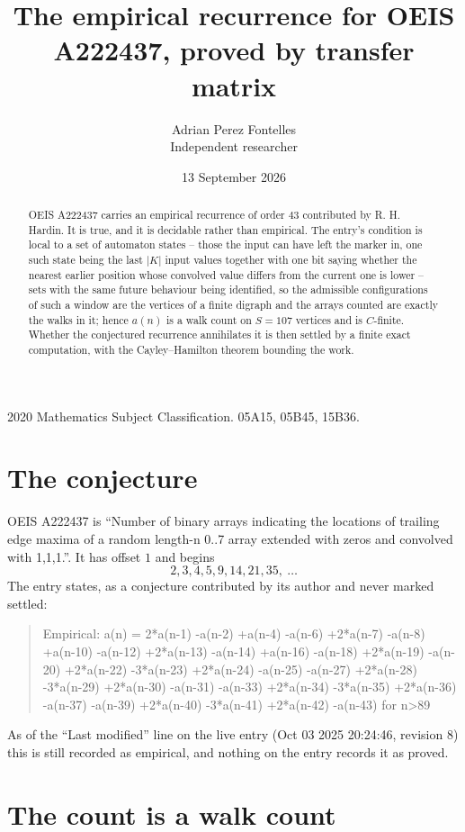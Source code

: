 \documentclass[11pt,a4paper]{article}
\title{The empirical recurrence for OEIS A222437, proved by transfer matrix}
\author{Adrian Perez Fontelles\\ \small Independent researcher}
\date{13 September 2026}
\theoremstyle{plain}
\theoremstyle{definition}
\begin{document}
\maketitle

\begin{abstract}
OEIS A222437 carries an empirical recurrence of order $43$ contributed by R. H. Hardin. It is
true, and it is decidable rather than empirical. The entry's condition is local to a set of automaton states -- those the input can have left the marker in, one such state being the last $|K|$ input values together with one bit saying whether the nearest earlier position whose convolved value differs from the current one is lower -- sets with the same future behaviour being identified, so
the admissible configurations of such a window are the vertices of a finite digraph and the
arrays counted are exactly the walks in it; hence $a(n)$ is a walk count on $S=107$ vertices
and is $C$-finite. Whether the conjectured recurrence annihilates it is then settled by a
finite exact computation, with the Cayley--Hamilton theorem bounding the work.
\end{abstract}

\noindent\small 2020 Mathematics Subject Classification. 05A15, 05B45, 15B36.\normalsize

\section{The conjecture}

OEIS A222437 is ``Number of binary arrays indicating the locations of trailing edge maxima of a random length-n 0..7 array extended with zeros and convolved with 1,1,1.''. It has offset $1$ and begins
\[
2, 3, 4, 5, 9, 14, 21, 35,\ \dots
\]
The entry states, as a conjecture contributed by its author and never marked settled:
\begin{quote}
Empirical: a(n) = 2*a(n-1) -a(n-2) +a(n-4) -a(n-6) +2*a(n-7) -a(n-8) +a(n-10) -a(n-12) +2*a(n-13) -a(n-14) +a(n-16) -a(n-18) +2*a(n-19) -a(n-20) +2*a(n-22) -3*a(n-23) +2*a(n-24) -a(n-25) -a(n-27) +2*a(n-28) -3*a(n-29) +2*a(n-30) -a(n-31) -a(n-33) +2*a(n-34) -3*a(n-35) +2*a(n-36) -a(n-37) -a(n-39) +2*a(n-40) -3*a(n-41) +2*a(n-42) -a(n-43) for n>89
\end{quote}
As of the ``Last modified'' line on the live entry (Oct 03 2025 20:24:46, revision 8) this is still
recorded as empirical, and nothing on the entry records it as proved.

\section{The count is a walk count}
\end{document}
